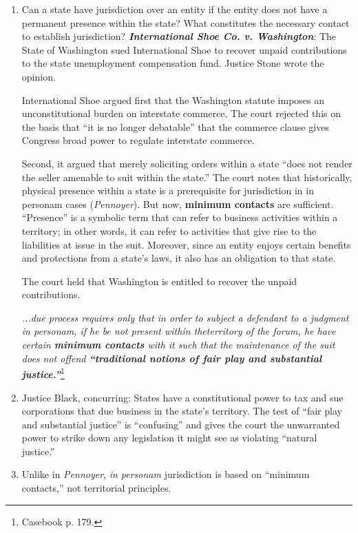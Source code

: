 \begin{enumerate}
    \item Can a state have jurisdiction over an entity if the entity does not 
    have a permanent presence within the state? What constitutes the necessary 
    contact to establish jurisdiction? \textbf{\emph{International Shoe Co. v. 
    Washington}}: The State of Washington sued International Shoe to recover 
    unpaid contributions to the state unemployment compensation fund. Justice 
    Stone wrote the opinion.

    International Shoe argued first that the Washington statute imposes an 
    unconstitutional burden on interstate commerce. The court rejected this on 
    the basis that ``it is no longer debatable'' that the commerce clause 
    gives Congress broad power to regulate interstate commerce.

    Second, it argued that merely soliciting orders within a state ``does not 
    render the seller amenable to suit within the state.'' The court notes 
    that historically, physical presence within a state is a prerequisite for 
    jurisdiction in in personam cases (\emph{Pennoyer}). But now, 
    \textbf{minimum contacts} are sufficient. ``Presence'' is a symbolic term 
    that can refer to business activities within a territory; in other words, 
    it can refer to activities that give rise to the liabilities at issue in 
    the suit. Moreover, since an entity enjoys certain benefits and 
    protections from a state's laws, it also has an obligation to that state.

    The court held that Washington is entitled to recover the unpaid 
    contributions.

\emph{...due process requires only that in order to subject a defendant to a 
judgment in personam, if he be not present within theterritory of the forum, 
he have certain \textbf{minimum contacts} with it such that the maintenance of 
the suit does not offend \textbf{``traditional notions of fair play and 
substantial justice.''}}\footnote{Casebook p. 179.}
    \item Justice Black, concurring: States have a constitutional power to tax 
    and sue corporations that due business in the state's territory. The test 
    of ``fair play and substantial justice'' is ``confusing'' and gives the 
    court the unwarranted power to strike down any legislation it might see as 
    violating ``natural justice.''
    \item Unlike in \emph{Pennoyer}, \emph{in personam} jurisdiction is based 
    on ``minimum contacts,'' not territorial principles.
\end{enumerate}

